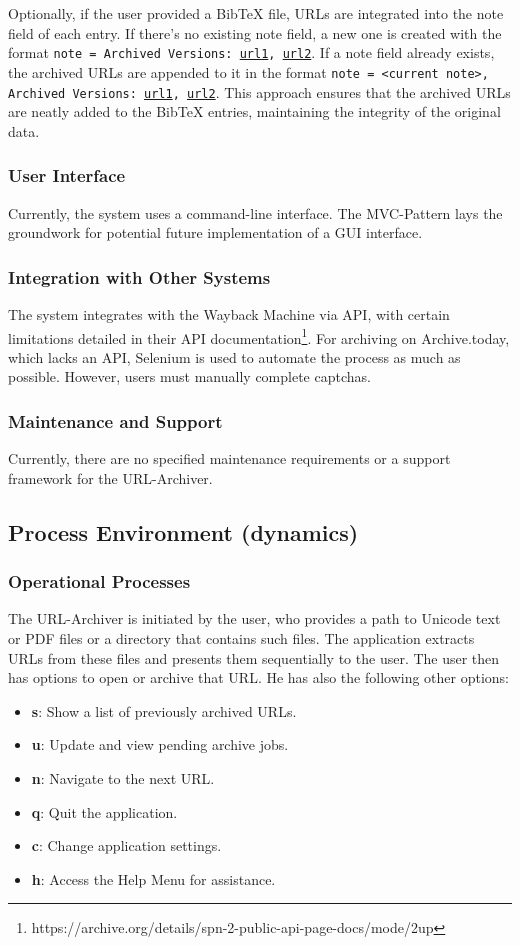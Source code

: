 Optionally, if the user provided a BibTeX file, URLs are integrated into the note field of each entry. If there's no existing note field, a new one is created with the format \texttt{note = {Archived Versions: \url{url1}, \url{url2}}}. If a note field already exists, the archived URLs are appended to it in the format \texttt{note = {<current note>, Archived Versions: \url{url1}, \url{url2}}}. This approach ensures that the archived URLs are neatly added to the BibTeX entries, maintaining the integrity of the original data.

\subsubsection{User Interface}
Currently, the system uses a command-line interface. The MVC-Pattern  lays the groundwork for potential future implementation of a GUI interface.

\subsubsection{Integration with Other Systems}
The system integrates with the Wayback Machine via API, with certain limitations detailed in their API documentation\footnote{https://archive.org/details/spn-2-public-api-page-docs/mode/2up}. For archiving on Archive.today, which lacks an API, Selenium is used to automate the process as much as possible. However, users must manually complete captchas.

\subsubsection{Maintenance and Support}
Currently, there are no specified maintenance requirements or a support framework for the URL-Archiver.


\subsection{Process Environment (dynamics)}


\subsubsection{Operational Processes}
The URL-Archiver is initiated by the user, who provides a path to Unicode text or PDF files or a directory that contains such files. The application extracts URLs from these files and presents them sequentially to the user. The user then has options to open or archive that URL. He has also the following other options: 
\begin{itemize}
	\item \textbf{s}: Show a list of previously archived URLs.
	\item \textbf{u}: Update and view pending archive jobs.
	\item \textbf{n}: Navigate to the next URL.
	\item \textbf{q}: Quit the application.
	\item \textbf{c}: Change application settings.
	\item \textbf{h}: Access the Help Menu for assistance.
\end{itemize}


